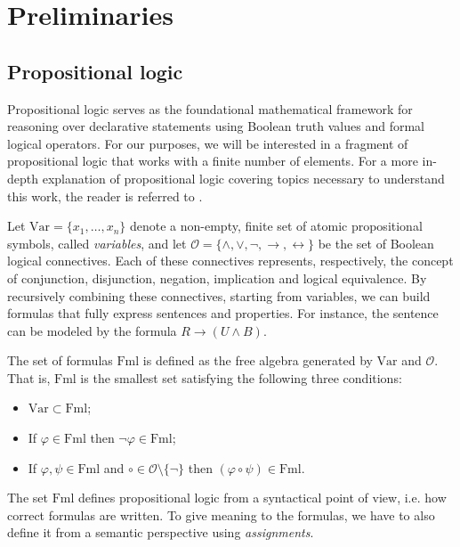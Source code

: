 \chapter{Preliminaries} \label{chap:preliminaries}

\section{Propositional logic}

Propositional logic serves as the foundational mathematical framework for reasoning over declarative statements using Boolean truth values and formal logical operators. For our purposes, we will be interested in a fragment of propositional logic that works with a finite number of elements. For a more in-depth explanation of propositional logic covering topics necessary to understand this work, the reader is referred to \cite{logic_book,kraj_book,galesi_toran}.

Let $\mathrm{Var} = \{x_1, \ldots, x_n\}$ denote a non-empty, finite set of atomic propositional symbols, called \textit{variables}, and let $\mathscr{O} = \{\land, \lor, \lnot, \to, \leftrightarrow\}$ be the set of Boolean logical connectives. Each of these connectives represents, respectively, the concept of conjunction, disjunction, negation, implication and logical equivalence. By recursively combining these connectives, starting from variables, we can build formulas that fully express sentences and properties. For instance, the sentence  can be modeled by the formula $R \to (U \land B)$.

\begin{definition}
  The set of formulas $\mathrm{Fml}$ is defined as the free algebra generated by $\mathrm{Var}$ and $\mathscr{O}$. That is, $\mathrm{Fml}$ is the smallest set satisfying the following three conditions:
  \begin{itemize}
    \item $\mathrm{Var} \subset \mathrm{Fml}$;
    \item If $\varphi \in \mathrm{Fml}$ then $\neg \varphi \in \mathrm{Fml}$;
    \item If $\varphi, \psi \in \mathrm{Fml}$ and $\circ \in \mathscr{O}\setminus \{\lnot\}$ then $(\varphi \circ \psi) \in \mathrm{Fml}$.
  \end{itemize}
\end{definition}

The set $\mathrm{Fml}$ defines propositional logic from a syntactical point of view, i.e. how correct formulas are written. To give meaning to the formulas, we have to also define it from a semantic perspective using \textit{assignments}.


